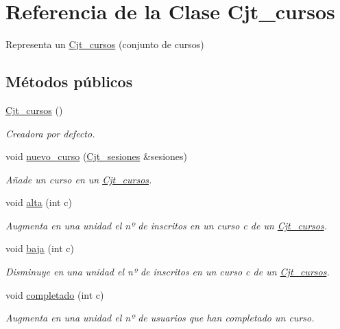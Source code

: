 \hypertarget{class_cjt__cursos}{}\section{Referencia de la Clase Cjt\+\_\+cursos}
\label{class_cjt__cursos}


Representa un \mbox{\hyperlink{class_cjt__cursos}{Cjt\+\_\+cursos}} (conjunto de cursos)  


\subsection*{Métodos públicos}
\begin{DoxyCompactItemize}
\item 
\mbox{\hyperlink{class_cjt__cursos_acabe06047f0b2a3093dc75c8a70a4dd2}{Cjt\+\_\+cursos}} ()
\begin{DoxyCompactList}\small\item\em Creadora por defecto. \end{DoxyCompactList}\item 
void \mbox{\hyperlink{class_cjt__cursos_ae2e0a96f014dda94b0d8465838cf14b6}{nuevo\+\_\+curso}} (\mbox{\hyperlink{class_cjt__sesiones}{Cjt\+\_\+sesiones}} \&sesiones)
\begin{DoxyCompactList}\small\item\em Añade un curso en un \mbox{\hyperlink{class_cjt__cursos}{Cjt\+\_\+cursos}}. \end{DoxyCompactList}\item 
void \mbox{\hyperlink{class_cjt__cursos_a974c8ac07471f9354fb13616a489f726}{alta}} (int c)
\begin{DoxyCompactList}\small\item\em Augmenta en una unidad el nº de inscritos en un curso c de un \mbox{\hyperlink{class_cjt__cursos}{Cjt\+\_\+cursos}}. \end{DoxyCompactList}\item 
void \mbox{\hyperlink{class_cjt__cursos_a01b47ced7b3b96ea87775bb4e2f0302a}{baja}} (int c)
\begin{DoxyCompactList}\small\item\em Disminuye en una unidad el nº de inscritos en un curso c de un \mbox{\hyperlink{class_cjt__cursos}{Cjt\+\_\+cursos}}. \end{DoxyCompactList}\item 
void \mbox{\hyperlink{class_cjt__cursos_a140c61d43f549aa71503f5b8b080c48c}{completado}} (int c)
\begin{DoxyCompactList}\small\item\em Augmenta en una unidad el nº de usuarios que han completado un curso. \end{DoxyCompactList}\item 

\end{DoxyCompactItemize}
